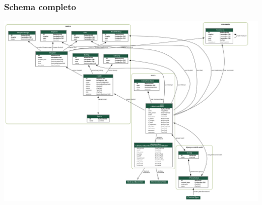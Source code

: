 \subsubsection{Schema completo}
\begin{center}
  \includegraphics[width=1.3\linewidth, angle=90]{images/project.png}
\end{center}